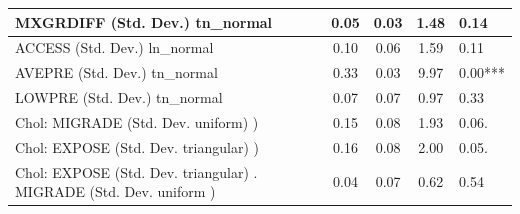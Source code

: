 \begin{table}
\begin{center}
\begin{tabular}{|l|l|c|c|c|l|}
			\hline
			MXGRDIFF (Std. Dev.) tn_normal &  & 0.05 & 0.03 & 1.48 & 0.14 \\
			\hline
			ACCESS (Std. Dev.) ln_normal &  & 0.10 & 0.06 & 1.59 & 0.11 \\
			\hline
			AVEPRE (Std. Dev.) tn_normal &  & 0.33 & 0.03 & 9.97 & 0.00*** \\
			\hline
			LOWPRE (Std. Dev.) tn_normal &  & 0.07 & 0.07 & 0.97 & 0.33 \\
			\hline
			 Chol: MIGRADE (Std. Dev. uniform) ) &  & 0.15 & 0.08 & 1.93 & 0.06. \\
			\hline
			 Chol: EXPOSE (Std. Dev. triangular) ) &  & 0.16 & 0.08 & 2.00 & 0.05. \\
			\hline
			 Chol: EXPOSE (Std. Dev. triangular) . MIGRADE (Std. Dev.   uniform ) &  & 0.04 & 0.07 & 0.62 & 0.54 \\
			\hline
		\end{tabular}
	\end{center}
\end{table}